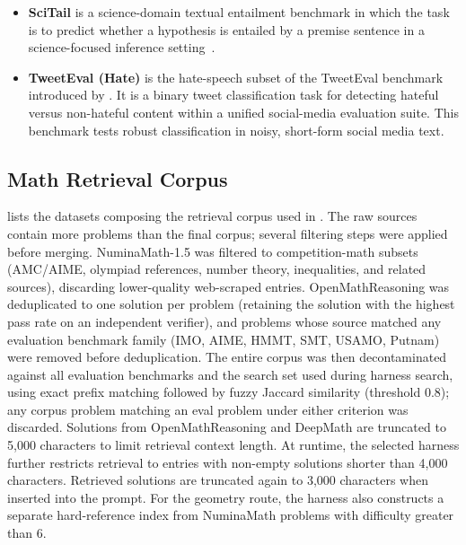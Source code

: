 \begin{itemize}[leftmargin=*,itemsep=2pt,topsep=2pt]
\item \textbf{SciTail} is a science-domain textual entailment benchmark in which the task is to predict whether a hypothesis is entailed by a premise sentence in a science-focused inference setting~\citep{Khot_Sabharwal_Clark_2018}.
\item \textbf{TweetEval (Hate)} is the hate-speech subset of the TweetEval benchmark introduced by \citet{barbieri2020tweetevalunifiedbenchmarkcomparative}. It is a binary tweet classification task for detecting hateful versus non-hateful content within a unified social-media evaluation suite. This benchmark tests robust classification in noisy, short-form social media text.
\end{itemize}

\subsection{Math Retrieval Corpus}
\label{app:math-corpus}

 lists the datasets composing the retrieval corpus used in .
The raw sources contain more problems than the final corpus; several filtering steps were applied before merging.
NuminaMath-1.5 was filtered to competition-math subsets (AMC/AIME, olympiad references, number theory, inequalities, and related sources), discarding lower-quality web-scraped entries.
OpenMathReasoning was deduplicated to one solution per problem (retaining the solution with the highest pass rate on an independent verifier), and problems whose source matched any evaluation benchmark family (IMO, AIME, HMMT, SMT, USAMO, Putnam) were removed before deduplication.
The entire corpus was then decontaminated against all evaluation benchmarks and the search set used during harness search, using exact prefix matching followed by fuzzy Jaccard similarity (threshold 0.8); any corpus problem matching an eval problem under either criterion was discarded.
Solutions from OpenMathReasoning and DeepMath are truncated to 5{,}000 characters to limit retrieval context length.
At runtime, the selected harness further restricts retrieval to entries with non-empty solutions shorter than 4{,}000 characters.
Retrieved solutions are truncated again to 3{,}000 characters when inserted into the prompt.
For the geometry route, the harness also constructs a separate hard-reference index from NuminaMath problems with difficulty greater than 6.

